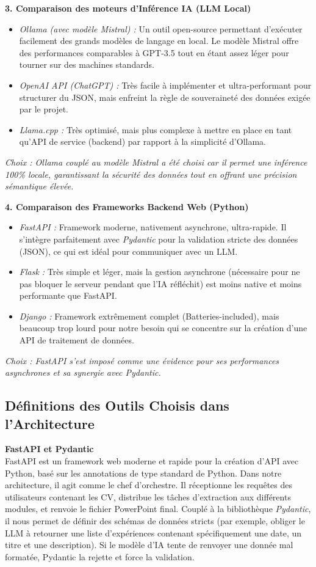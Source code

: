 \textbf{3. Comparaison des moteurs d'Inférence IA (LLM Local)}
\begin{itemize}
    \item \textit{Ollama (avec modèle Mistral) :} Un outil open-source permettant d'exécuter facilement des grands modèles de langage en local. Le modèle Mistral offre des performances comparables à GPT-3.5 tout en étant assez léger pour tourner sur des machines standards.
    \item \textit{OpenAI API (ChatGPT) :} Très facile à implémenter et ultra-performant pour structurer du JSON, mais enfreint la règle de souveraineté des données exigée par le projet.
    \item \textit{Llama.cpp :} Très optimisé, mais plus complexe à mettre en place en tant qu'API de service (backend) par rapport à la simplicité d'Ollama.
\end{itemize}
\textit{Choix : Ollama couplé au modèle Mistral a été choisi car il permet une inférence 100\% locale, garantissant la sécurité des données tout en offrant une précision sémantique élevée.}

\textbf{4. Comparaison des Frameworks Backend Web (Python)}
\begin{itemize}
    \item \textit{FastAPI :} Framework moderne, nativement asynchrone, ultra-rapide. Il s'intègre parfaitement avec \textit{Pydantic} pour la validation stricte des données (JSON), ce qui est idéal pour communiquer avec un LLM.
    \item \textit{Flask :} Très simple et léger, mais la gestion asynchrone (nécessaire pour ne pas bloquer le serveur pendant que l'IA réfléchit) est moins native et moins performante que FastAPI.
    \item \textit{Django :} Framework extrêmement complet (Batteries-included), mais beaucoup trop lourd pour notre besoin qui se concentre sur la création d'une API de traitement de données.
\end{itemize}
\textit{Choix : FastAPI s'est imposé comme une évidence pour ses performances asynchrones et sa synergie avec Pydantic.}


\subsection{Définitions des Outils Choisis dans l'Architecture}

\textbf{FastAPI et Pydantic} \\
FastAPI est un framework web moderne et rapide pour la création d'API avec Python, basé sur les annotations de type standard de Python. Dans notre architecture, il agit comme le chef d'orchestre. Il réceptionne les requêtes des utilisateurs contenant les CV, distribue les tâches d'extraction aux différents modules, et renvoie le fichier PowerPoint final. Couplé à la bibliothèque \textit{Pydantic}, il nous permet de définir des schémas de données stricts (par exemple, obliger le LLM à retourner une liste d'expériences contenant spécifiquement une date, un titre et une description). Si le modèle d'IA tente de renvoyer une donnée mal formatée, Pydantic la rejette et force la validation.

